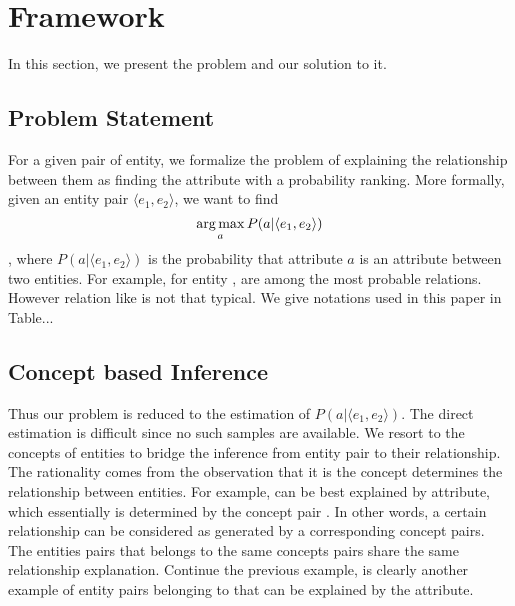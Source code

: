 
\section{Framework}
\label{sec:framework}

In this section, we present the problem and our solution to it.

\subsection{Problem Statement}

For a given pair of entity, we formalize the problem of explaining the relationship between them as finding the attribute with a probability ranking.
More formally, given an entity pair $ \langle e_1, e_2 \rangle $, we want to find
\begin{equation}
\operatorname*{arg\,max}_a P(a|\langle e_1,e_2 \rangle)
\end{equation},
where $P(a| \langle e_1, e_2 \rangle )$ is the probability that attribute $a$ is an attribute between two entities.
For example, for entity ,  are among the most probable relations.
However relation like  is not that typical. We give notations used in this paper in Table...

\subsection{Concept based Inference}
Thus our problem is reduced to the estimation of $P(a| \langle e_1, e_2 \rangle )$.
The direct estimation is difficult since no such samples are available.
We resort to the concepts of entities to bridge the inference from entity pair to their relationship.
The rationality comes from the observation that it is the concept determines the relationship between entities.
For example,  can be best explained by  attribute, which essentially is determined by the concept pair .
In other words, a certain relationship can be considered as generated by a corresponding concept pairs.
The entities pairs that belongs to the same concepts pairs share the same relationship explanation.
Continue the previous example,  is clearly another example of entity pairs belonging to  that can be explained by the  attribute.

